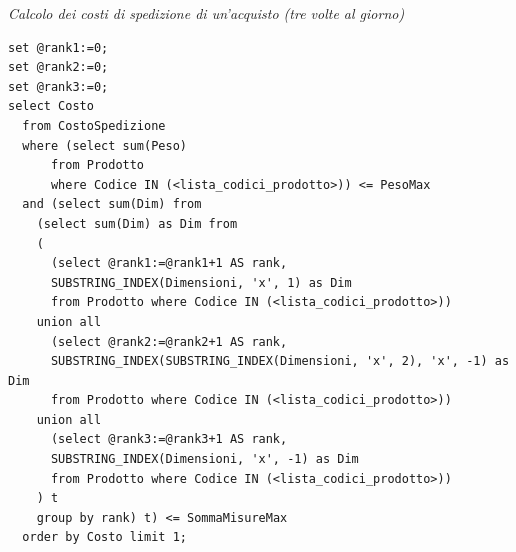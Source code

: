 \noindent{}
\newline\newline

\noindent\textit{Calcolo dei costi di spedizione di un'acquisto (tre volte al giorno)}
\begin{verbatim}
set @rank1:=0;
set @rank2:=0;
set @rank3:=0;
select Costo
  from CostoSpedizione
  where (select sum(Peso)
      from Prodotto
      where Codice IN (<lista_codici_prodotto>)) <= PesoMax
  and (select sum(Dim) from
    (select sum(Dim) as Dim from
    (
      (select @rank1:=@rank1+1 AS rank,
      SUBSTRING_INDEX(Dimensioni, 'x', 1) as Dim
      from Prodotto where Codice IN (<lista_codici_prodotto>))
    union all
      (select @rank2:=@rank2+1 AS rank,
      SUBSTRING_INDEX(SUBSTRING_INDEX(Dimensioni, 'x', 2), 'x', -1) as Dim
      from Prodotto where Codice IN (<lista_codici_prodotto>))
    union all
      (select @rank3:=@rank3+1 AS rank,
      SUBSTRING_INDEX(Dimensioni, 'x', -1) as Dim
      from Prodotto where Codice IN (<lista_codici_prodotto>))
    ) t
    group by rank) t) <= SommaMisureMax
  order by Costo limit 1;
\end{verbatim}
\vspace{0.5cm}

\noindent{}
\newline\newline

